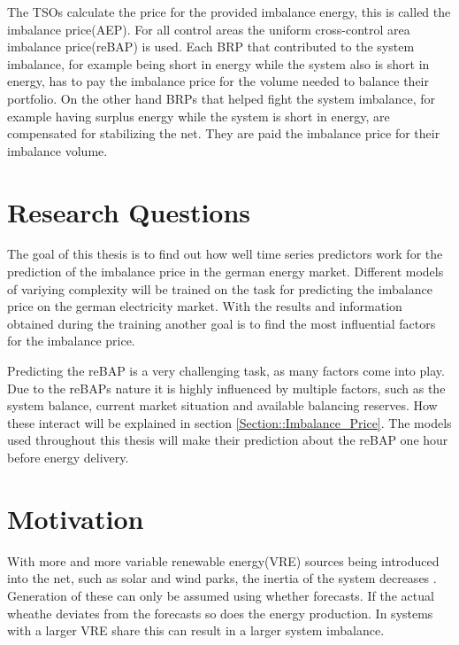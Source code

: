 \documentclass[class=scrbook, crop=false]{standalone}
\begin{document}
The TSOs calculate the price for the provided imbalance energy, this is called the imbalance price(AEP). For all control areas the uniform cross-control area imbalance price(reBAP) is used. 
Each BRP that contributed to the system imbalance, for example being short in energy while the system also is short in energy, has to pay the imbalance price for the volume needed to balance their portfolio. On the other hand BRPs that helped fight the system imbalance, for example having surplus energy while the system is short in energy, are compensated for stabilizing the net. They are paid the imbalance price for their imbalance volume\cite{eickeElectricityBalancingMarket2021}.



\section{Research Questions}
\label{Section::Research_Questions}
The goal of this thesis is to find out how well time series predictors work for the prediction of the imbalance price in the german energy market. 
Different models of variying complexity will be trained on the task for predicting the imbalance price on the german electricity market. 
With the results and information obtained during the training another goal is to find the most influential factors for the imbalance price.

Predicting the reBAP is a very challenging task, as many factors come into play.
Due to the reBAPs nature it is highly influenced by multiple factors, such as the system balance, current market situation and available balancing reserves. 
How these interact will be explained in section \ref{Section::Imbalance_Price}. 
The models used throughout this thesis will make their prediction about the reBAP one hour before energy delivery. 


\section{Motivation}
\label{Section::Motivation}

With more and more variable renewable energy(VRE) sources being introduced into the net, such as solar and wind parks, the inertia of the system decreases \cite{weitemeyerIntegrationRenewableEnergy2015}. 
Generation of these can only be assumed using whether forecasts. If the actual wheathe deviates from the forecasts so does the energy production. In systems with a larger VRE share this can result in a larger system imbalance. 
\end{document}
